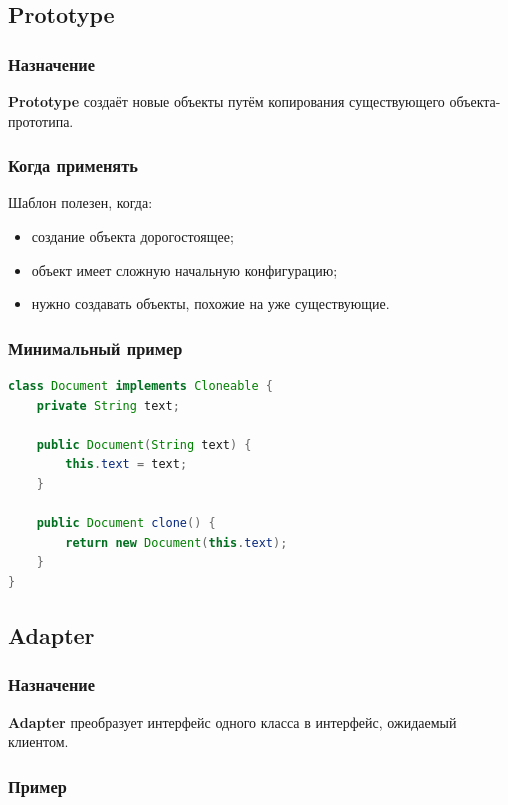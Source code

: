 \documentclass[12pt,a4paper]{article}
\begin{document}
\subsection{Prototype}

\subsubsection{Назначение}

\textbf{Prototype} создаёт новые объекты путём копирования существующего объекта-прототипа.

\subsubsection{Когда применять}

Шаблон полезен, когда:
\begin{itemize}
    \item создание объекта дорогостоящее;
    \item объект имеет сложную начальную конфигурацию;
    \item нужно создавать объекты, похожие на уже существующие.
\end{itemize}

\subsubsection{Минимальный пример}

\begin{lstlisting}[language=Java,caption={Prototype}]
class Document implements Cloneable {
    private String text;

    public Document(String text) {
        this.text = text;
    }

    public Document clone() {
        return new Document(this.text);
    }
}
\end{lstlisting}

\subsection{Adapter}

\subsubsection{Назначение}

\textbf{Adapter} преобразует интерфейс одного класса в интерфейс, ожидаемый клиентом.

\subsubsection{Пример}
\end{document}
